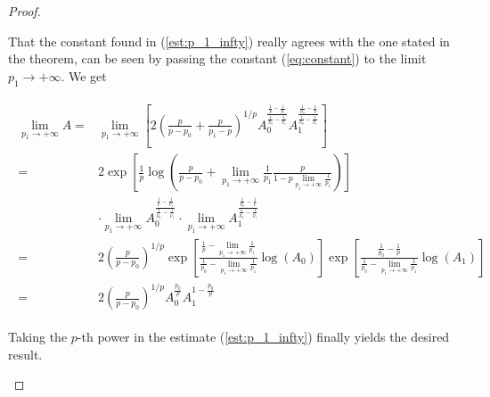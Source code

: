 \begin{proof}
\begin{enumerate}[label = \textbf{(\roman*.)}]
\begin{enumerate}[label = \textbf{\alph*.}]
	That the constant found in (\ref{est:p_1_infty}) really agrees with the one stated in the theorem, can be seen by passing the constant (\ref{eq:constant}) to the limit $p_1 \rightarrow + \infty$. We get

	\begin{gather}
		\begin{aligned}
			\lim\limits_{p_1 \rightarrow + \infty} A =& \lim\limits_{p_1 \rightarrow + \infty}	\left[2\left( \frac{p}{p - p_0} + \frac{p}{p_1 - p} \right)^{1/p}A_0^{\frac{\frac{1}{p} - \frac{1}{p_1}}{\frac{1}{p_0}-\frac{1}{p_1}}}A_1^{\frac{\frac{1}{p_0}-\frac{1}{p}}{\frac{1}{p_0}-\frac{1}{p_1}}}\right]\\
			=& 2\exp\left[ \frac{1}{p} \log\left(\frac{p}{p - p_0} + \lim\limits_{p_1 \rightarrow + \infty} \frac{1}{p_1}\frac{p}{1 - p\lim\limits_{p_1 \rightarrow + \infty}\frac{1}{p_1}}\right)\right]\\
			& \cdot \lim\limits_{p_1 \rightarrow + \infty}A_0^{\frac{\frac{1}{p} - \frac{1}{p_1}}{\frac{1}{p_0}-\frac{1}{p_1}}}\cdot\lim\limits_{p_1 \rightarrow + \infty}A_1^{\frac{\frac{1}{p_0}-\frac{1}{p}}{\frac{1}{p_0}-\frac{1}{p_1}}}\\
		=& 2\left( \frac{p}{p - p_0} \right)^{1/p} \exp\left[\displaystyle\frac{\frac{1}{p} - \lim\limits_{p_1 \rightarrow + \infty}\frac{1}{p_1}}{\frac{1}{p_0}-\lim\limits_{p_1 \rightarrow + \infty}\frac{1}{p_1}}\log(A_0)\right] \exp\left[\frac{\frac{1}{p_0}-\frac{1}{p}}{\frac{1}{p_0}-\lim\limits_{p_1 \rightarrow + \infty}\frac{1}{p_1}}\log(A_1)\right]\\
		=& 2\left( \frac{p}{p - p_0} \right)^{1/p} A_0^{\frac{p_0}{p}} A_1^{1 - \frac{p_0}{p}}
		\end{aligned}
	\end{gather}

	Taking the $p$-th power in the estimate (\ref{est:p_1_infty}) finally yields the desired result.
	\end{enumerate}

\end{enumerate}
\end{proof}
